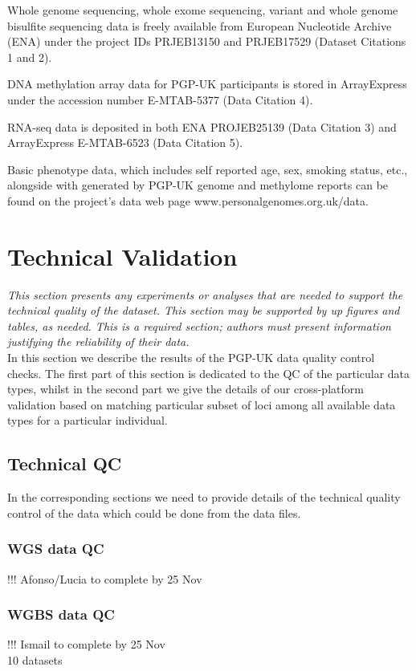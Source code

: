 \documentclass[english]{article}
\begin{document}
Whole genome sequencing, whole exome sequencing, variant and whole genome bisulfite sequencing data is freely available from European Nucleotide Archive (ENA) under the project IDs PRJEB13150 and PRJEB17529 (Dataset Citations 1 and 2).

DNA methylation array data for PGP-UK participants is stored in ArrayExpress under the accession number E-MTAB-5377 (Data Citation 4).

RNA-seq data is deposited in both ENA PROJEB25139 (Data Citation 3) and ArrayExpress E-MTAB-6523 (Data Citation 5).

Basic phenotype data, which includes self reported age, sex, smoking status, etc., alongside with generated by PGP-UK genome and methylome reports can be found on the project's data web page www.personalgenomes.org.uk/data.

\section*{Technical Validation}

\textit{This section presents any experiments or analyses that are needed
to support the technical quality of the dataset. This section may
be supported by up figures and tables, as needed. This is a required
section; authors must present information justifying the reliability
of their data.}\\

In this section we describe the results of the PGP-UK data quality control checks. The first part of this section is dedicated to the QC of the particular data types, whilst in the second part we give the details of our cross-platform validation based on matching particular subset of loci among all available data types for a particular individual.

\subsection*{Technical QC}
{\color{Red} In the corresponding sections we need to provide details of the technical quality control of the data which could be done from the data files.}

\subsubsection*{WGS data QC}
\colorbox{BurntOrange}{!!! Afonso/Lucia to complete by 25 Nov}\\


\subsubsection*{WGBS data QC}
\colorbox{BurntOrange}{!!! Ismail to complete by 25 Nov}\\
10 datasets
\end{document}
